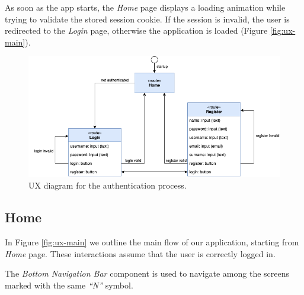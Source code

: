 As soon as the app starts, the \emph{Home} page displays a loading animation while trying to validate the stored session cookie.
If the session is invalid, the user is redirected to the \emph{Login} page, otherwise the application is loaded (Figure \ref{fig:ux-main}).

\begin{figure}[H]
      \includegraphics{ux-diagram/ux-auth.png}
      \caption{UX diagram for the authentication process.}
      \label{fig:ux-auth}
\end{figure}

\subsection{Home}
In Figure \ref{fig:ux-main} we outline the main flow of our application, starting from \emph{Home} page.
These interactions assume that the user is correctly logged in.

The \emph{Bottom Navigation Bar} component is used to navigate among the screens marked with the same \emph{``N''} symbol.

